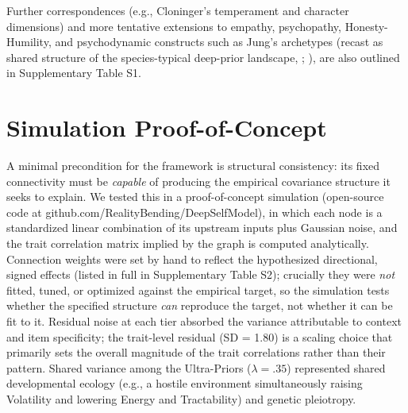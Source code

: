 \documentclass[
  jou,
  floatsintext,
  longtable,
  nolmodern,
  notxfonts,
  notimes,
  12pt,
  colorlinks=true,linkcolor=blue,citecolor=blue,urlcolor=blue]{apa7}
\begin{document}
Further correspondences (e.g., Cloninger's temperament and character
dimensions) and more tentative extensions to empathy, psychopathy,
Honesty-Humility, and psychodynamic constructs such as Jung's archetypes
(recast as shared structure of the species-typical deep-prior landscape,
;
), are also
outlined in Supplementary Table S1.

\section{Simulation Proof-of-Concept}\label{simulation-proof-of-concept}

A minimal precondition for the framework is structural consistency: its
fixed connectivity must be \emph{capable} of producing the empirical
covariance structure it seeks to explain. We tested this in a
proof-of-concept simulation (open-source code at
github.com/RealityBending/DeepSelfModel), in which each node is a
standardized linear combination of its upstream inputs plus Gaussian
noise, and the trait correlation matrix implied by the graph is computed
analytically. Connection weights were set by hand to reflect the
hypothesized directional, signed effects (listed in full in
Supplementary Table S2); crucially they were \emph{not} fitted, tuned,
or optimized against the empirical target, so the simulation tests
whether the specified structure \emph{can} reproduce the target, not
whether it can be fit to it. Residual noise at each tier absorbed the
variance attributable to context and item specificity; the trait-level
residual (SD = 1.80) is a scaling choice that primarily sets the overall
magnitude of the trait correlations rather than their pattern. Shared
variance among the Ultra-Priors (\(\lambda = .35\)) represented shared
developmental ecology (e.g., a hostile environment simultaneously
raising Volatility and lowering Energy and Tractability) and genetic
pleiotropy.
\end{document}
